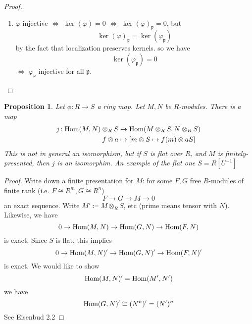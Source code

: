 \documentclass[12pt]{article}
\newcommand{\ho}[2]{\textup{Hom}(#1,#2)}
\newcommand\inv[1]{#1^{-1}}
\newcommand{\mapping}[5]{\begin{align*}
#1\colon #2 &\to #3\\
#4 & \mapsto #5
\end{align*}}
\def\p{\mathfrak{p}}
\newtheorem{prop}[theorem]{Proposition}
\theoremstyle{definition}
\begin{document}
\begin{proof}
\begin{enumerate}
    \item $\varphi$ injective $\iff$  $\ker(\varphi) = 0$ $\iff$ $\ker(\varphi)_\p = 0$, but
    \[
    \ker(\varphi)_\p = \ker(\varphi_\p)
    \]
    by the fact that localization preserves kernels. so we have
    \[
    \ker(\varphi_\p) =0
    \]
    $\iff$ $\varphi_\p$ injective for all $\p$.
\end{enumerate}
\end{proof}
\begin{prop}
Let $\phi: R \rightarrow S$ a ring map. Let $M,N$ be $R$-modules. There is a map
\[
\mapping{j}{\ho{M}{N} \otimes_R S}{\ho{M \otimes_R S}{N \otimes_R S}}{f \otimes a }{[m\otimes S \mapsto f(m)\otimes aS]}
\]
This is not in general an isomorphism, but if $S$ is flat over $R$, and $M$ is finitely-presented, then $j$ is an isomorphim. An example of the flat one $S=R[\inv{U}]$
\end{prop}
\begin{proof}
Write down a finite presentation for $M$: for some $F,G$ free $R$-modules of finite rank (i.e. $F \cong R^m,G \cong R^n$)
\[
F \rightarrow G \rightarrow M \rightarrow 0
\]
an exact sequence. Write $M' \coloneqq M \otimes_R S$, etc (prime means tensor with $N$). Likewise, we have
\[
0\rightarrow \ho{M}{N} \rightarrow \ho{G}{N} \rightarrow \ho{F}{N}
\]
is exact. Since $S$ is flat, this implies
\[
0 \rightarrow \ho{M}{N}' \rightarrow \ho{G}{N}' \rightarrow \ho{F}{N}'
\]
is exact. We would like to show
\[
\ho{M}{N}' = \ho{M'}{N'}
\]
we have 
\[
\ho{G}{N}' \cong (N^n)' = (N')^n
\]
See Eisenbud 2.2
\end{proof}
\date{16.10.2018}
\end{document}
